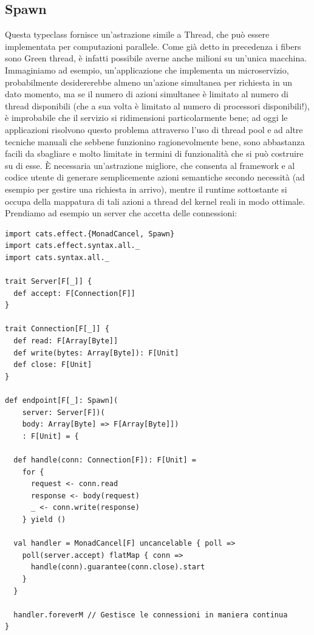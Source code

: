 \subsection{Spawn}
Questa typeclass fornisce un’astrazione simile a Thread, che può essere implementata per computazioni parallele. Come già detto in precedenza i fibers sono Green thread, è infatti possibile averne anche milioni su un’unica macchina. Immaginiamo ad esempio, un'applicazione che implementa un microservizio, probabilmente desidererebbe almeno un'azione simultanea per richiesta in un dato momento, ma se il numero di azioni simultanee è limitato al numero di thread disponibili (che a sua volta è limitato al numero di processori disponibili!), è improbabile che il servizio si ridimensioni particolarmente bene; ad oggi le applicazioni risolvono questo problema attraverso l'uso di thread pool e ad altre tecniche manuali che sebbene funzionino ragionevolmente bene, sono abbastanza facili da sbagliare e molto limitate in termini di funzionalità che si può costruire su di esse. È necessaria un'astrazione migliore, che consenta al framework e al codice utente di generare semplicemente azioni semantiche secondo necessità (ad esempio per gestire una richiesta in arrivo), mentre il runtime sottostante si occupa della mappatura di tali azioni a thread del kernel reali in modo ottimale. Prendiamo ad esempio un server che accetta delle connessioni:

\begin{verbatim}
import cats.effect.{MonadCancel, Spawn}
import cats.effect.syntax.all._
import cats.syntax.all._

trait Server[F[_]] {
  def accept: F[Connection[F]]
}

trait Connection[F[_]] {
  def read: F[Array[Byte]]
  def write(bytes: Array[Byte]): F[Unit]
  def close: F[Unit]
}

def endpoint[F[_]: Spawn](
    server: Server[F])(
    body: Array[Byte] => F[Array[Byte]])
    : F[Unit] = {

  def handle(conn: Connection[F]): F[Unit] =
    for {
      request <- conn.read
      response <- body(request)
      _ <- conn.write(response)
    } yield ()

  val handler = MonadCancel[F] uncancelable { poll =>
    poll(server.accept) flatMap { conn =>
      handle(conn).guarantee(conn.close).start
    }
  }

  handler.foreverM // Gestisce le connessioni in maniera continua
}
\end{verbatim}

